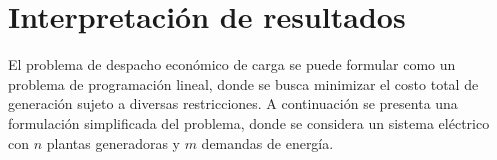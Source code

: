 \documentclass[11pt]{article}
\begin{document}
\newpage
\section{Interpretación de resultados}	
El problema de despacho económico de carga se puede formular como un problema de programación lineal, donde se busca minimizar el costo total de generación sujeto a diversas restricciones. A continuación se presenta una formulación simplificada del problema, donde se considera un sistema eléctrico con $n$ plantas generadoras y $m$ demandas de energía.

\newpage
\end{document}
